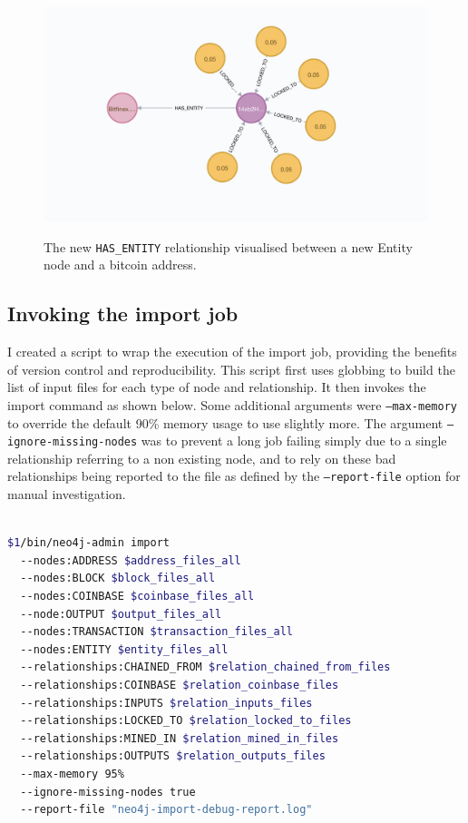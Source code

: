 \begin{figure}[h!]
  \centering
  \includegraphics[width = 15cm]{./figures/has-entity-relationship}\\[0.5cm] 
  \caption{The new \texttt{HAS\_ENTITY} relationship visualised between a new Entity node and a bitcoin address.}
  \label{fig:neo4j-has-entity}
\end{figure}

\subsection{Invoking the import job}
I created a script to wrap the execution of the import job, providing the benefits of version control and reproducibility. This script first uses globbing to build the list of input files for each type of node and relationship. It then invokes the import command as shown below. Some additional arguments were \texttt{--max-memory} to override the default 90\% memory usage to use slightly more. The argument \texttt{--ignore-missing-nodes} was to prevent a long job failing simply due to a single relationship referring to a non existing node, and to rely on these bad relationships being reported to the file as defined by the \texttt{--report-file} option for manual investigation. 
\\\\
\begin{lstlisting}[language=Bash]
$1/bin/neo4j-admin import 
  --nodes:ADDRESS $address_files_all
  --nodes:BLOCK $block_files_all
  --nodes:COINBASE $coinbase_files_all
  --node:OUTPUT $output_files_all
  --nodes:TRANSACTION $transaction_files_all 
  --nodes:ENTITY $entity_files_all
  --relationships:CHAINED_FROM $relation_chained_from_files 
  --relationships:COINBASE $relation_coinbase_files 
  --relationships:INPUTS $relation_inputs_files 
  --relationships:LOCKED_TO $relation_locked_to_files 
  --relationships:MINED_IN $relation_mined_in_files 
  --relationships:OUTPUTS $relation_outputs_files 
  --max-memory 95% 
  --ignore-missing-nodes true 
  --report-file "neo4j-import-debug-report.log" 
\end{lstlisting}

